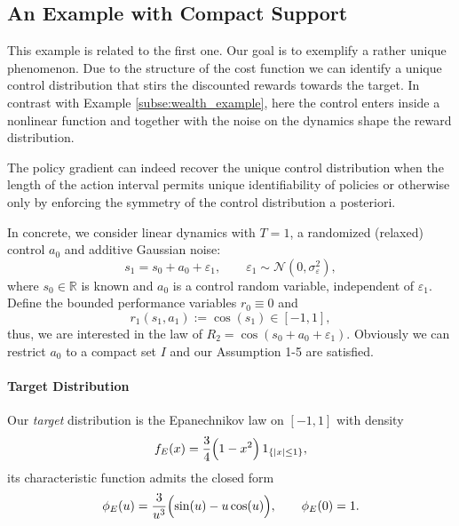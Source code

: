 \documentclass[reqno, 11pt]{amsart}%
\theoremstyle{definition}
\begin{document}
\subsection{An Example with Compact Support}
This example is related to the first one. Our goal is to exemplify a rather unique phenomenon. Due to the structure of the cost function we can identify a unique control distribution that stirs the discounted rewards towards the target. In contrast with Example \ref{subse:wealth_example}, here the control enters inside a nonlinear function and together with the noise on the dynamics shape the reward distribution.

The policy gradient can indeed recover the unique control distribution when the length of the action interval permits unique identifiability of policies or otherwise only by enforcing the symmetry of the control distribution a posteriori. 

In concrete, we consider linear dynamics with $T=1$, a randomized (relaxed) control $a_0$ and additive Gaussian noise:
\begin{equation}
\label{eq:dynamics2}
 s_1 = s_0 + a_0 + \varepsilon_1, \qquad \varepsilon_1 \sim \mathcal N(0,\sigma_\varepsilon^2),
\end{equation}
where $s_0\in\mathbb R$ is known and $a_0$ is a control random variable, independent of $\varepsilon_1$.
Define the bounded performance variables $r_0\equiv 0$ and
\begin{equation}
\label{eq:r-def}
 r_1(s_1,a_1) := \cos(s_1) \in [-1,1],
\end{equation}
thus, we are interested in the law of $R_2=\cos(s_0+a_0+\varepsilon_1).$ Obviously we can restrict $a_0$ to a compact set $I$ and our Assumption 1-5 are satisfied.
\paragraph{Target Distribution}
Our \emph{target} distribution is the Epanechnikov law on $[-1,1]$ with density
\begin{equation}
\label{eq:epa-density}
 f_E(x) = \frac{3}{4}\Bigl(1 - x^2\Bigr)\,1_{\{|x|\le 1\}},
\end{equation}
its characteristic function admits the closed form
\begin{equation}
\label{eq:phiE}
 \phi_E(u) = \frac{3}{u^3}\Bigl(\sin(u ) - u \cos(u)\Bigr), \qquad \phi_E(0)=1.
\end{equation}
\end{document}
